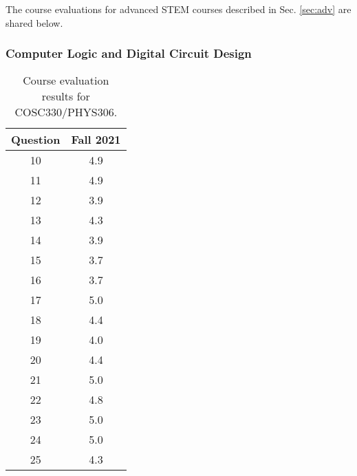 \documentclass[../../main.tex]{subfiles}
\begin{document}
The course evaluations for advanced STEM courses described in Sec. \ref{sec:adv} are shared below.

\subsubsection{Computer Logic and Digital Circuit Design}

\begin{table}
\footnotesize
\centering
\begin{tabular}{| c | c |}
\hline
\hline
Question & Fall 2021 \\ \hline
10 & 4.9 \\ \hline
11 & 4.9 \\ \hline
12 & 3.9 \\ \hline
13 & 4.3 \\ \hline
14 & 3.9 \\ \hline
15 & 3.7 \\ \hline
16 & 3.7 \\ \hline
17 & 5.0 \\ \hline
18 & 4.4 \\ \hline
19 & 4.0 \\ \hline
20 & 4.4 \\ \hline
21 & 5.0 \\ \hline
22 & 4.8 \\ \hline
23 & 5.0 \\ \hline
24 & 5.0 \\ \hline
25 & 4.3 \\ \hline
\hline
\end{tabular}
\caption{\label{tab:eval_330_306} Course evaluation results for COSC330/PHYS306.}
\end{table}
\end{document}
